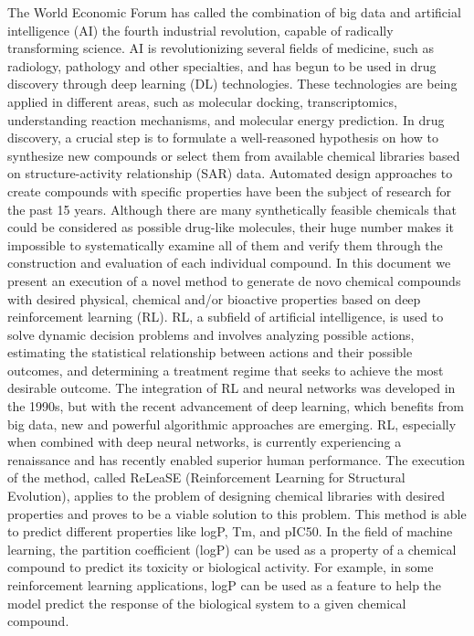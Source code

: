 \documentclass[a4paper]{article}
\begin{document}
The World Economic Forum has called the combination of big data and artificial intelligence (AI) the fourth industrial revolution, capable of radically transforming science. AI is revolutionizing several fields of medicine, such as radiology, pathology and other specialties, and has begun to be used in drug discovery through deep learning (DL) technologies. 
These technologies are being applied in different areas, such as molecular docking, transcriptomics, understanding reaction mechanisms, and molecular energy prediction.
In drug discovery, a crucial step is to formulate a well-reasoned hypothesis on how to synthesize new compounds or select them from available chemical libraries based on structure-activity relationship (SAR) data. Automated design approaches to create compounds with specific properties have been the subject of research for the past 15 years. Although there are many synthetically feasible chemicals that could be considered as possible drug-like molecules, their huge number makes it impossible to systematically examine all of them and verify them through the construction and evaluation of each individual compound. 
In this document we present an execution of a novel method to generate de novo chemical compounds with desired physical, chemical and/or bioactive properties based on deep reinforcement learning (RL). 
RL, a subfield of artificial intelligence, is used to solve dynamic decision problems and involves analyzing possible actions, estimating the statistical relationship between actions and their possible outcomes, and determining a treatment regime that seeks to achieve the most desirable outcome. 
The integration of RL and neural networks was developed in the 1990s, but with the recent advancement of deep learning, which benefits from big data, new and powerful algorithmic approaches are emerging. RL, especially when combined with deep neural networks, is currently experiencing a renaissance and has recently enabled superior human performance. 
The execution of the method, called ReLeaSE (Reinforcement Learning for Structural Evolution), applies to the problem of designing chemical libraries with desired properties and proves to be a viable solution to this problem. This method is able to predict different properties like logP, Tm, and pIC50.
In the field of machine learning, the partition coefficient (logP) can be used as a property of a chemical compound to predict its toxicity or biological activity. For example, in some reinforcement learning applications, logP can be used as a feature to help the model predict the response of the biological system to a given chemical compound.
\end{document}
